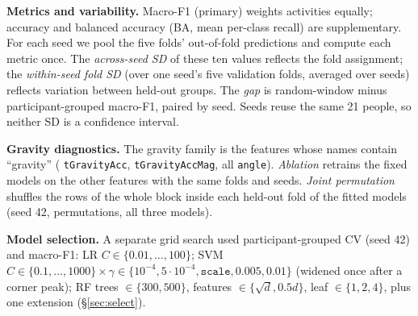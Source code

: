 \documentclass{article}
\begin{document}
\textbf{Metrics and variability.} Macro-F1 (primary) weights activities equally; accuracy and balanced accuracy (BA, mean per-class recall) are supplementary. For each seed we pool the five folds' out-of-fold predictions and compute each metric once. The \emph{across-seed SD} of these ten values reflects the fold assignment; the \emph{within-seed fold SD} (over one seed's five validation folds, averaged over seeds) reflects variation between held-out groups. The \emph{gap} is random-window minus participant-grouped macro-F1, paired by seed. Seeds reuse the same 21 people, so neither SD is a confidence interval.

\textbf{Gravity diagnostics.} The gravity family is the \Nngrav{} features whose names contain ``gravity'' (\Nntgrav{} \texttt{tGravityAcc}, \Nntgravmag{} \texttt{tGravityAccMag}, all \Nnangle{} \texttt{angle}). \emph{Ablation} retrains the fixed models on the other \Nnkeep{} features with the same folds and seeds. \emph{Joint permutation} shuffles the rows of the whole block inside each held-out fold of the fitted models (seed 42, \Nnperm{} permutations, all three models).

\textbf{Model selection.} A separate grid search used participant-grouped CV (seed 42) and macro-F1: LR $C\in\{0.01,\dots,100\}$; SVM $C\in\{0.1,\dots,1000\}\times\gamma\in\{10^{-4},5{\cdot}10^{-4},\texttt{scale},0.005,0.01\}$ (widened once after a corner peak); RF trees $\in\{300,500\}$, features $\in\{\sqrt{d},0.5d\}$, leaf $\in\{1,2,4\}$, plus one extension (\S\ref{sec:select}).
\end{document}
